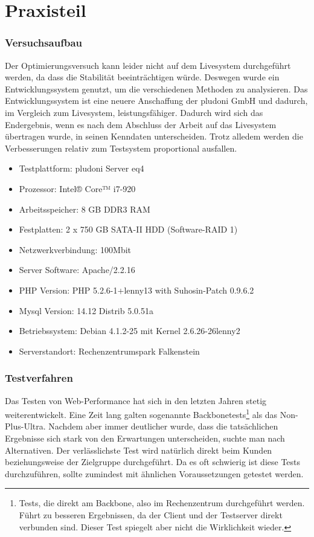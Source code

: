 \part{Praxisteil}

\section{Versuchsaufbau}
Der Optimierungsversuch kann leider nicht auf dem Livesystem durchgeführt werden, da dass die Stabilität beeinträchtigen würde. Deswegen wurde ein Entwicklungssystem genutzt, um die verschiedenen Methoden zu analysieren. Das Entwicklungssystem ist eine neuere Anschaffung der pludoni GmbH und dadurch, im Vergleich zum Livesystem, leistungsfähiger. Dadurch wird sich das Endergebnis, wenn es nach dem Abschluss der Arbeit auf das Livesystem übertragen wurde, in seinen Kenndaten unterscheiden. Trotz alledem werden die Verbesserungen relativ zum Testsystem proportional ausfallen. 

\begin{itemize}
 \item Testplattform: pludoni Server eq4
  \item Prozessor: Intel® Core™ i7-920 
  \item Arbeitsspeicher: 8 GB DDR3 RAM
  \item Festplatten: 2 x 750 GB SATA-II HDD (Software-RAID 1)
  \item Netzwerkverbindung: 100Mbit
  \item Server Software: Apache/2.2.16
  \item PHP Version: PHP 5.2.6-1+lenny13 with Suhosin-Patch 0.9.6.2
  \item Mysql Version: 14.12 Distrib 5.0.51a 
  \item Betriebssystem: Debian 4.1.2-25 mit Kernel 2.6.26-26lenny2
  \item Serverstandort: Rechenzentrumspark Falkenstein
\end{itemize}

\section{Testverfahren}
Das Testen von Web-Performance hat sich in den letzten Jahren stetig weiterentwickelt. Eine Zeit lang galten sogenannte Backbonetests\footnote{Tests, die direkt am Backbone, also im Rechenzentrum durchgef\"uhrt werden. F\"uhrt zu besseren Ergebnissen, da der Client und der Testserver direkt verbunden sind. Dieser Test spiegelt aber nicht die Wirklichkeit wieder.} als das Non-Plus-Ultra. Nachdem aber immer deutlicher wurde, dass die tatsächlichen Ergebnisse sich stark von den Erwartungen unterscheiden, suchte man nach Alternativen. Der verlässlichste Test wird natürlich direkt beim Kunden beziehungsweise der Zielgruppe durchgeführt. Da es oft schwierig ist diese Tests durchzuführen, sollte zumindest mit ähnlichen Voraussetzungen getestet werden.
